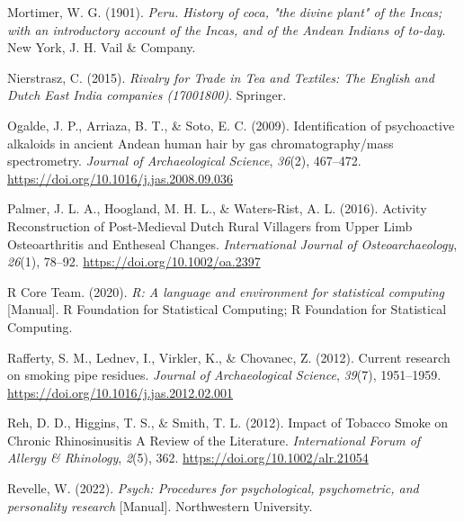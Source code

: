 \documentclass[
  b5paper,
]{book}
\newlength{\cslhangindent}
\newlength{\cslentryspacingunit} %
\newenvironment{CSLReferences}[2] %
 {%
  \setlength{\parindent}{0pt}
  \ifodd #1
  \let\oldpar\par
  \def\par{\hangindent=\cslhangindent\oldpar}
  \fi
  \setlength{\parskip}{#2\cslentryspacingunit}
 }%
 {}
\begin{document}
\begin{CSLReferences}{1}{0}
\leavevmode{}%
Mortimer, W. G. (1901). \emph{Peru. {History} of coca, "the divine
plant" of the {Incas}; with an introductory account of the {Incas}, and
of the {Andean Indians} of to-day}. {New York, J. H. Vail \& Company}.

\leavevmode{}%
Nierstrasz, C. (2015). \emph{Rivalry for {Trade} in {Tea} and
{Textiles}: {The English} and {Dutch East India} companies
(1700{\textendash}1800)}. {Springer}.

\leavevmode{}%
Ogalde, J. P., Arriaza, B. T., \& Soto, E. C. (2009). Identification of
psychoactive alkaloids in ancient {Andean} human hair by gas
chromatography/mass spectrometry. \emph{Journal of Archaeological
Science}, \emph{36}(2), 467--472.
\url{https://doi.org/10.1016/j.jas.2008.09.036}

\leavevmode{}%
Palmer, J. L. A., Hoogland, M. H. L., \& Waters-Rist, A. L. (2016).
Activity {Reconstruction} of {Post}-{Medieval Dutch Rural Villagers}
from {Upper Limb Osteoarthritis} and {Entheseal Changes}.
\emph{International Journal of Osteoarchaeology}, \emph{26}(1), 78--92.
\url{https://doi.org/10.1002/oa.2397}

\leavevmode{}%
R Core Team. (2020). \emph{R: {A} language and environment for
statistical computing} {[}Manual{]}. {R Foundation for Statistical
Computing}; {R Foundation for Statistical Computing}.

\leavevmode{}%
Rafferty, S. M., Lednev, I., Virkler, K., \& Chovanec, Z. (2012).
Current research on smoking pipe residues. \emph{Journal of
Archaeological Science}, \emph{39}(7), 1951--1959.
\url{https://doi.org/10.1016/j.jas.2012.02.001}

\leavevmode{}%
Reh, D. D., Higgins, T. S., \& Smith, T. L. (2012). Impact of {Tobacco
Smoke} on {Chronic Rhinosinusitis} {\textendash} {A Review} of the
{Literature}. \emph{International Forum of Allergy \& Rhinology},
\emph{2}(5), 362. \url{https://doi.org/10.1002/alr.21054}

\leavevmode{}%
Revelle, W. (2022). \emph{Psych: {Procedures} for psychological,
psychometric, and personality research} {[}Manual{]}. {Northwestern
University}.


\end{CSLReferences}
\end{document}
